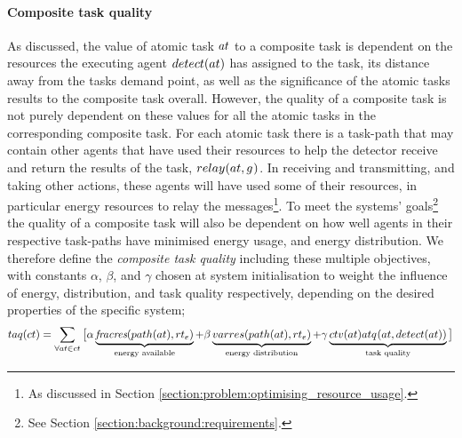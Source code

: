 \paragraph{Composite task quality}
\label{section:composite_task_quality}

\newcommand{\functionCompositeTaskQuality}[2]{
	\functionSignature{taq}{\varCompositeTask{}{}}
}

As discussed, the value of atomic task $\varAtomicTask{}{}$ to a composite task is dependent on the resources the executing agent $\functionDetectorRole{}{}$ has assigned to the task, its distance away from the tasks demand point, as well as the significance of the atomic tasks results to the composite task overall. However, the quality of a composite task is not purely dependent on these values for all the atomic tasks in the corresponding composite task. For each atomic task there is a task-path that may contain other agents that have used their resources to help the detector receive and return the results of the task, $\functionRelayRole{}{}{}$. In receiving and transmitting, and taking other actions, these agents will have used some of their resources, in particular energy resources to relay the messages\footnote{As discussed in Section \ref{section:problem:optimising_resource_usage}.}. To meet the systems' goals\footnote{See Section \ref{section:background:requirements}.}  the quality of a composite task will also be dependent on how well agents in their respective task-paths have minimised energy usage, and energy distribution.  We therefore define the \textit{composite task quality} including these multiple objectives, with constants $\alpha$, $\beta$, and $\gamma$ chosen at system initialisation to weight the influence of energy, distribution, and task quality respectively, depending on the desired properties of the specific system; 
\begin{equation}
	\label{eq:taq}
	\functionCompositeTaskQuality{}{} = 
	\sum\limits_{\forall \varAtomicTask{}{} \in \varCompositeTask{}{}}
	\big\lbrack
	\alpha\underbrace{\functionTaskPathEnergyAvailable{}{}}_{\text{energy available}}
	+ \beta\underbrace{\functionTaskPathEnergyVariability{\functionTaskArc{}{}}{}}_{\text{energy distribution}}
	+ 
	\gamma\underbrace{
		\functionComponentTaskValue{}{}
		\functionAtomicTaskQualitySignature{\varAtomicTask{}{}}{\functionDetectorRole{}{}}
	}_{\text{task quality}}
\big\rbrack
\end{equation}

